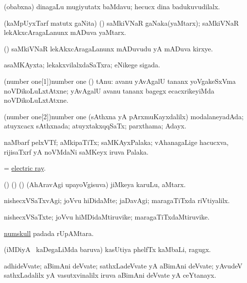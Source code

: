\noindent
\gl{\pagu}
\bmng
{}(obabxna) dinagaLu mugiyutatx baMdavu; hecucx dina badukuvudilalx. 
\emng
\eentry

\bentry
{}
\gl{\nA}
\bmng
(kaMpUyxTarf matutx gaNita) (\ashi) saMkiVNaR gaNaka(yaMtarx); saMkiVNaR lekAkxcAragaLanunx mADuva yaMtarx. 
\emng
\eentry

\bentry
{}
\gl{\nA}
\bmng
(\ashi) saMkiVNaR lekAkxcAragaLanunx mADuvudu yA mADuva kirxye. 
\emng
\eentry

\bentry
{}
\gl{\gu}
\bmng
asaMKAyxta; lekakxvilalxdaSaTxra; eNikege sigada. 
\emng
\eentry

\bentry
\word(number one[1]){number one}
\pron{}
\gl{\nA}
\bmng
(\AmA) tAnu:  avanu yAvAgalU tananx yoVgakeSxVma noVDikoLuLxtAtxne; yAvAgalU avanu tananx bagegx ecacxrikeyiMda noVDikoLuLxtAtxne. 
\emng
\eentry

\bentry
\word(number one[2]){number one}
\pron{}
\gl{\gu}
\bmng
(sAthxna yA pArxmuKayxdalilx) modalaneyadAda; atuyxcacx sAthxnada; atuyxtakxqqSaTx; parxthama; Adayx. 
\emng
\eentry

\bentry
{}
\gl{\nA}
\bmng
naMbarf pelxVTf; aMkipaTiTx; saMKAyxPalaka; vAhanagaLige hacucxva, rijisaTxrf yA noVMdaNi saMKeyx iruva Palaka. 
\emng
\eentry

\bentry
{}
\gl{\nA}
\bmng
= \hyperref{kandict_e.pdf}{E}{electric ray}{electric ray}. 
\emng
\eentry

\bentry
{}
\gl{\nA}
\bmng
(\bava) (\birx) (\pArxparx) (AhAravAgi upayoVgisuva) jiMkeya karuLu, aMtarx. 
\emng
\eentry

\bentry
{}
\gl{\kirxvi}
\bmng
nishecxVSaTxvAgi; joVvu hiDidaMte; jaDavAgi; maragaTiTxda riVtiyalilx. 
\emng
\eentry

\bentry
{}
\gl{\nA}
\bmng
nishecxVSaTxte; joVvu hiMDidaMtiruvike; maragaTiTxdaMtiruvike. 
\emng
\eentry


\bentry
{}
\gl{\nA}
\bmng
\hyperlink{numskull}{numskull} padada rUpAMtara. 
\emng
\eentry

\bentry
{}
\gl{\nA}
\bmng
(iMDiyA \mo\ kaDegaLiMda baruva) kasUtiya phelfTx kaMbaLi, ragugx. 
\emng
\eentry

\bentry
{}
\gl{\nA}
\bmng
adhideVvate; aBimAni deVvate; sathxLadeVvate yA aBimAni deVvate; yAvudeV sathxLadalilx yA vasutxvinalilx iruva aBimAni deVvate yA ceYtanayx. 
\emng
\eentry

